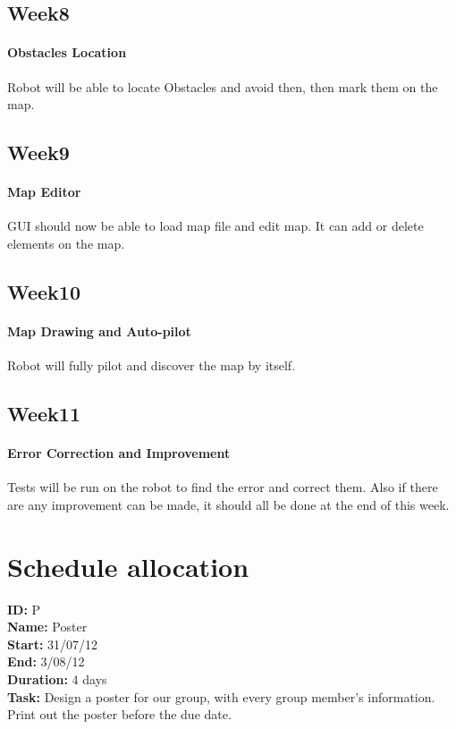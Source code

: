 \documentclass[11pt, a4paper]{report}
\begin{document}
\subsection{Week8}
\paragraph{Obstacles Location}
Robot will be able to locate Obstacles and avoid then, then mark them on the map.


\subsection{Week9}
\paragraph{Map Editor}
GUI should now be able to load map file and edit map. It can add or delete elements on the map.




\subsection{Week10}
\paragraph{Map Drawing and Auto-pilot}
Robot will fully pilot and discover the map by itself.


\subsection{Week11}
\paragraph{Error Correction and Improvement}
Tests will be run on the robot to find the error and correct them. Also if there are any improvement can be made, it should all be done at the end of this week.



\section{Schedule allocation}

\noindent \textbf{ID:} P \\
\noindent \textbf{Name:} Poster \\
\noindent \textbf{Start:} 31/07/12 \\
\noindent \textbf{End:} 3/08/12 \\
\noindent \textbf{Duration:} 4 days \\
\noindent \textbf{Task:}  Design a poster for our group, with every group member's information. Print out the poster before the due date.\\[0.5cm]
\end{document}
